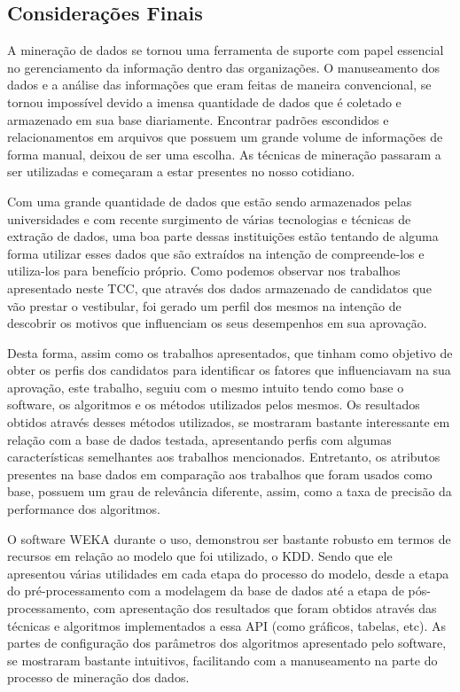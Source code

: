 \label{chapter:consideracoes}

\subsection{Considerações Finais}

\par 
A mineração de dados se tornou uma ferramenta de suporte com papel essencial no gerenciamento da informação dentro das organizações. O manuseamento dos dados e a análise das informações que eram feitas de maneira convencional, se tornou impossível devido a imensa quantidade de dados que é coletado e armazenado em sua base diariamente. Encontrar padrões escondidos e relacionamentos em arquivos que possuem um grande volume de informações de forma manual, deixou de ser uma escolha. As técnicas de mineração passaram a ser utilizadas e começaram a estar presentes no nosso cotidiano.

\par
Com uma grande quantidade de dados que estão sendo armazenados pelas universidades e com recente surgimento de várias tecnologias e técnicas de extração de dados, uma boa parte dessas instituições estão tentando de alguma forma utilizar esses dados que são extraídos  na intenção de compreende-los e utiliza-los para benefício próprio. Como podemos observar nos trabalhos apresentado neste TCC, que através dos dados armazenado de candidatos que vão prestar o vestibular, foi gerado um perfil dos mesmos na intenção de descobrir os motivos que influenciam os seus desempenhos em sua aprovação.

\par
Desta forma, assim como os trabalhos apresentados, que tinham como objetivo de obter os perfis dos candidatos para identificar os fatores que influenciavam na sua aprovação, este trabalho, seguiu com o mesmo intuito tendo como base o software, os algoritmos e os métodos utilizados pelos mesmos. Os resultados obtidos através desses métodos utilizados, se mostraram bastante interessante em relação com a base de dados testada, apresentando perfis com algumas características semelhantes aos trabalhos mencionados. Entretanto, os atributos presentes na base dados em comparação aos trabalhos que foram usados como base, possuem um grau de relevância diferente, assim, como a taxa de precisão da performance dos algoritmos.

\par
O software WEKA durante o uso, demonstrou ser bastante robusto em termos de recursos em relação ao modelo que foi utilizado, o KDD. Sendo que ele apresentou várias utilidades em cada etapa do processo do modelo, desde a etapa do pré-processamento com a modelagem da base de dados até a etapa de pós-processamento, com apresentação dos resultados que foram obtidos através das técnicas e algoritmos implementados a essa API (como gráficos, tabelas, etc). As partes de configuração dos parâmetros dos algoritmos apresentado pelo software, se mostraram bastante intuitivos, facilitando com a manuseamento na parte do processo de mineração dos dados.

